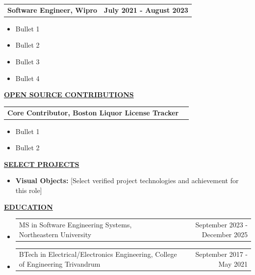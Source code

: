 \documentclass[letterpaper,10pt]{article}
\makeatletter
\newcommand{\resumeSection}[1]{%
  \vspace{12.2bp}
  {\bfseries\underline{#1}}\par
}
\newcommand{\resumeSubheading}[2]{%
  \begin{tabular*}{\textwidth}{@{}l@{\extracolsep{\fill}}r@{}}
    \bfseries #1 & \bfseries #2
  \end{tabular*}\par
}
\newcommand{\resumeSubHeadingListEnd}{\endgroup}
\newcommand{\resumeItemListStart}{%
  \begin{itemize}[
    leftmargin=36bp,
    labelindent=18.8bp,
    labelwidth=4.2bp,
    labelsep=13bp,
    topsep=0pt,
    partopsep=0pt,
    parsep=0pt,
    itemsep=0pt
  ]
}
\newcommand{\resumeItemListEnd}{\end{itemize}}
\newcommand{\resumeItem}[1]{\item #1}
\newcommand{\resumeProject}[2]{\resumeItem{\textbf{#1:} #2}}
\newcommand{\resumeEducationItem}[2]{%
  \item
  \begin{tabular*}{\linewidth}{@{}l@{\extracolsep{\fill}}r@{}}
    #1 & #2
  \end{tabular*}%
}
\makeatother
\begin{document}
\resumeSubheading{Software Engineer, Wipro}{July 2021 - August 2023}
\resumeItemListStart
  \resumeItem{Bullet 1}
  \resumeItem{Bullet 2}
  \resumeItem{Bullet 3}
  \resumeItem{Bullet 4}
\resumeItemListEnd
\resumeSubHeadingListEnd

\resumeSection{OPEN SOURCE CONTRIBUTIONS}
\resumeSubheading{Core Contributor, Boston Liquor License Tracker}{}
\resumeItemListStart
  \resumeItem{Bullet 1}
  \resumeItem{Bullet 2}
\resumeItemListEnd

\resumeSection{SELECT PROJECTS}
\resumeItemListStart
  \resumeProject{Visual Objects}{[Select verified project technologies and achievement for this role]}
\resumeItemListEnd

\resumeSection{EDUCATION}
\resumeItemListStart
  \resumeEducationItem{MS in Software Engineering Systems, Northeastern University}{September 2023 - December 2025}
  \resumeEducationItem{BTech in Electrical/Electronics Engineering, College of Engineering Trivandrum}{September 2017 - May 2021}
\resumeItemListEnd
\end{document}
